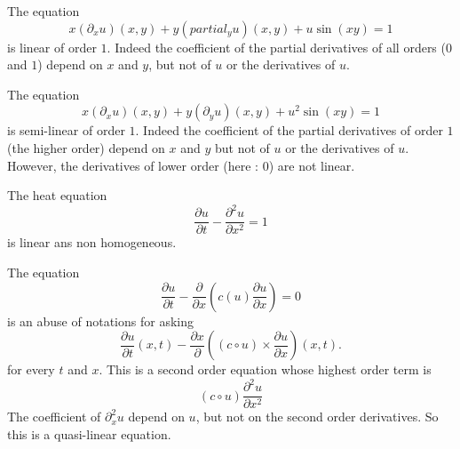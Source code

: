 \begin{example}
    The equation
    \begin{equation}
        x(\partial_xu)(x,y)+y(partial_yu)(x,y)+u\sin(xy)=1
    \end{equation}
    is linear of order \( 1\). Indeed the coefficient of the partial derivatives of all orders  (\( 0\) and \( 1\)) depend on \( x\) and \( y\), but not of \( u\) or the derivatives of \( u\). 
\end{example}

\begin{example}
    The equation
    \begin{equation}
        x(\partial_xu)(x,y)+y(\partial_yu)(x,y)+u^2\sin(xy)=1
    \end{equation}
    is semi-linear of order \( 1\). Indeed the coefficient of the partial derivatives of order \( 1\) (the higher order) depend on \( x\) and \( y\) but not of \( u\) or the derivatives of \( u\). However, the derivatives of lower order (here : \( 0\)) are not linear. 
\end{example}

\begin{example}
    The heat equation
    \begin{equation}
        \frac{ \partial u }{ \partial t }-\frac{ \partial^2u }{ \partial x^2 }=1
    \end{equation}
    is linear ans non homogeneous.
\end{example}

\begin{example}
    The equation
    \begin{equation}
        \frac{ \partial u }{ \partial t }-\frac{ \partial  }{ \partial x }\left( c(u)\frac{ \partial u }{ \partial x } \right)=0
    \end{equation}
    is an abuse of notations for asking 
    \begin{equation}
        \frac{ \partial u }{ \partial t }(x,t)-\frac{ \partial x }{ \partial  }\left( (c\circ u)\times \frac{ \partial u }{ \partial x } \right)(x,t).
    \end{equation}
    for every \( t\) and \( x\). This is a second order equation whose highest order term is
    \begin{equation}
        (c\circ u)\frac{ \partial^2u }{ \partial x^2 }
    \end{equation}
    The coefficient of \( \partial^2_xu\) depend on \( u\), but not on the second order derivatives. So this is a quasi-linear equation.
\end{example}

